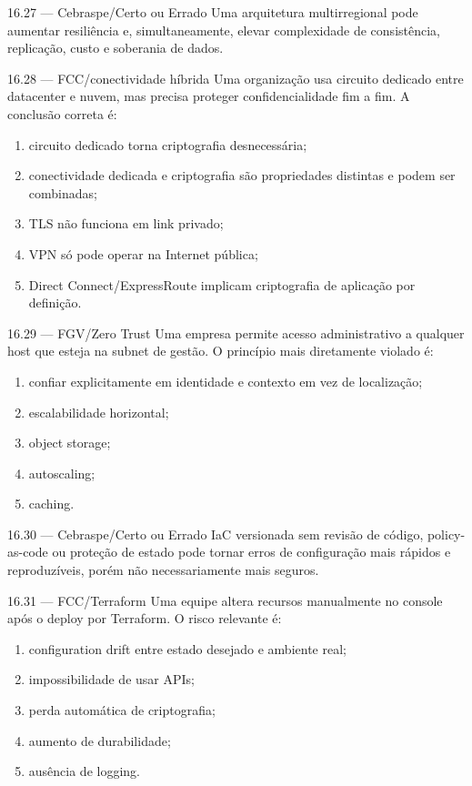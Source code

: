 \begin{questao}{ 16.27 — Cebraspe/Certo ou Errado}
Uma arquitetura multirregional pode aumentar resiliência e, simultaneamente, elevar complexidade de consistência, replicação, custo e soberania de dados.
\end{questao}

\begin{questao}{ 16.28 — FCC/conectividade híbrida}
Uma organização usa circuito dedicado entre datacenter e nuvem, mas precisa proteger confidencialidade fim a fim. A conclusão correta é:
\begin{enumerate}[label=\Alph*)]
\item circuito dedicado torna criptografia desnecessária;
\item conectividade dedicada e criptografia são propriedades distintas e podem ser combinadas;
\item TLS não funciona em link privado;
\item VPN só pode operar na Internet pública;
\item Direct Connect/ExpressRoute implicam criptografia de aplicação por definição.
\end{enumerate}
\end{questao}

\begin{questao}{ 16.29 — FGV/Zero Trust}
Uma empresa permite acesso administrativo a qualquer host que esteja na subnet de gestão. O princípio mais diretamente violado é:
\begin{enumerate}[label=\Alph*)]
\item confiar explicitamente em identidade e contexto em vez de localização;
\item escalabilidade horizontal;
\item object storage;
\item autoscaling;
\item caching.
\end{enumerate}
\end{questao}

\begin{questao}{ 16.30 — Cebraspe/Certo ou Errado}
IaC versionada sem revisão de código, policy-as-code ou proteção de estado pode tornar erros de configuração mais rápidos e reproduzíveis, porém não necessariamente mais seguros.
\end{questao}

\begin{questao}{ 16.31 — FCC/Terraform}
Uma equipe altera recursos manualmente no console após o deploy por Terraform. O risco relevante é:
\begin{enumerate}[label=\Alph*)]
\item configuration drift entre estado desejado e ambiente real;
\item impossibilidade de usar APIs;
\item perda automática de criptografia;
\item aumento de durabilidade;
\item ausência de logging.
\end{enumerate}
\end{questao}

